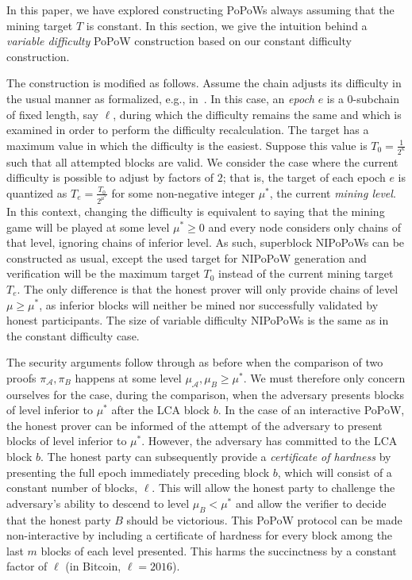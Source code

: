 
\label{sec:variable}

In this paper, we have explored constructing PoPoWs always assuming that the
mining target $T$ is constant. In this section, we give the intuition behind a
\emph{variable difficulty} PoPoW construction based on our constant difficulty
construction.

The construction is modified as follows. Assume the chain adjusts its difficulty
in the usual manner as formalized, e.g., in~\cite{backbone2}. In this case, an
\emph{epoch} $e$ is a $0$-subchain of fixed length, say $\ell$, during which the
difficulty remains the same and which is examined in order to perform the
difficulty recalculation. The target has a maximum value in which the difficulty
is the easiest. Suppose this value is $T_0 = \frac{1}{2^\kappa}$ such that all
attempted blocks are valid. We consider the case where the current difficulty is
possible to adjust by factors of $2$; that is, the target of each epoch $e$ is
quantized as $T_e = \frac{T_0}{2^{\mu^*}}$ for some non-negative integer
$\mu^*$, the current \emph{mining level}. In this context, changing the
difficulty is equivalent to saying that the mining game will be played at some
level $\mu^* \geq 0$ and every node considers only chains of that level,
ignoring chains of inferior level. As such, superblock NIPoPoWs can be
constructed as usual, except the used target for NIPoPoW generation and
verification will be the maximum target $T_0$ instead of the current mining
target $T_e$. The only difference is that the honest prover will only provide
chains of level $\mu \geq \mu^*$, as inferior blocks will neither be mined nor
successfully validated by honest participants. The size of variable difficulty
NIPoPoWs is the same as in the constant difficulty case.

The security arguments follow through as before when the comparison of two
proofs $\pi_\mathcal{A}, \pi_B$ happens at some level $\mu_\mathcal{A}, \mu_B
\geq \mu^*$. We must therefore only concern ourselves for the case, during the
comparison, when the adversary presents blocks of level inferior to $\mu^*$
after the LCA block $b$. In the case of an interactive PoPoW, the honest prover
can be informed of the attempt of the adversary to present blocks of level
inferior to $\mu^*$. However, the adversary has committed to the LCA block $b$.
The honest party can subsequently provide a \emph{certificate of hardness} by
presenting the full epoch immediately preceding block $b$, which will consist of
a constant number of blocks, $\ell$. This will allow the honest party to
challenge the adversary's ability to descend to level $\mu_B < \mu^*$ and allow
the verifier to decide that the honest party $B$ should be victorious. This
PoPoW protocol can be made non-interactive by including a certificate of
hardness for every block among the last $m$ blocks of each level presented. This
harms the succinctness by a constant factor of $\ell$ (in Bitcoin,
$\ell = 2016$).

